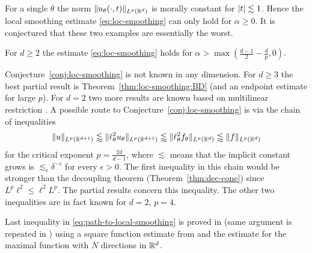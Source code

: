 For a single $\theta$ the norm $\lVert u_{\theta}(\cdot,t)\rVert_{L^{p}(\mathbb{R}^{d})}$ is morally constant for $\lvert t\rvert \lesssim 1$.
Hence the local smoothing estimate \eqref{eq:loc-smoothing} can only hold for $\alpha \geq 0$.
It is conjectured that these two examples are essentially the worst.
\begin{conjecture}[{\cite{MR1098614}}]
\label{conj:loc-smoothing}
For $d\geq 2$ the estimate \eqref{eq:loc-smoothing} holds for $\alpha > \max(\frac{d-1}{2} - \frac{d}{p}, 0)$.
\end{conjecture}
Conjecture~\ref{conj:loc-smoothing} is not known in any dimension.
For $d\geq 3$ the best partial result is Theorem~\ref{thm:loc-smoothing:BD} (and an endpoint estimate \cite{MR2784663} for large $p$).
For $d=2$ two more results are known based on multilinear restriction \cite{MR2927399,arxiv:1607.08426}.
A possible route to Conjecture~\ref{conj:loc-smoothing} is via the chain of inequalities
\begin{equation}
\label{eq:path-to-local-smoothing}
\lVert u\rVert_{L^{p}(\mathbb{R}^{d+1})}
\lessapprox
\lVert \ell^{2}_{\theta} u_{\theta}\rVert_{L^{p}(\mathbb{R}^{d+1})}
\lessapprox
\lVert \ell^{2}_{\theta} f_{\theta}\rVert_{L^{p}(\mathbb{R}^{d})}
\lessapprox
\lVert f \rVert_{L^{p}(\mathbb{R}^{d})}
\end{equation}
for the critical exponent $p = \frac{2 d}{d-1}$, where $\lesssim$ means that the implicit constant grows is $\lesssim_{\epsilon} \delta^{-\epsilon}$ for every $\epsilon>0$.
The first inequality in this chain would be stronger than the decoupling theorem (Theorem~\ref{thm:dec-cone}) since $L^{p} \ell^{2} \leq \ell^{2} L^{p}$.
The partial results concern this inequality.
The other two inequalities are in fact known for $d=2$, $p=4$.

Last inequality in \eqref{eq:path-to-local-smoothing} is proved in \cite{MR688026} (same argument is repeated in \cite{MR730074}) using a square function estimate from \cite{MR639467} and the estimate for the maximal function with $N$ directions in $\mathbb{R}^{d}$.

